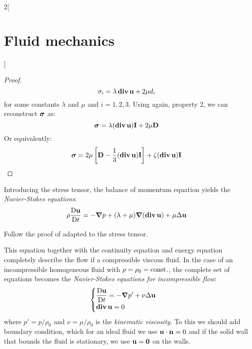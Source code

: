\documentclass[../../../main_physics.tex]{subfiles}
\begin{document}
\begin{multicols}{2}[\section{Fluid mechanics}]
\begin{proof}
    $$
      \sigma_i=\lambda \operatorname{\boldsymbol{\mathrm{div}}} \boldsymbol{\mathrm{u}} + 2\mu d_i
    $$
    for some constants $\lambda$ and $\mu$ and $i=1,2,3$. Using again, property 2, we can reconstruct $\boldsymbol{\mathrm{\sigma}}$ as:
    $$
      \boldsymbol{\mathrm{\sigma}}=\lambda (\operatorname{\boldsymbol{\mathrm{div}}} \boldsymbol{\mathrm{u}}) \boldsymbol{\mathrm{I}} + 2\mu \boldsymbol{\mathrm{D}}
    $$
    Or equivalently:
    $$
      \boldsymbol{\mathrm{\sigma}}=2\mu\left[\boldsymbol{\mathrm{D}} -\frac{1}{3}(\operatorname{\boldsymbol{\mathrm{div}}}\boldsymbol{\mathrm{u}}) \boldsymbol{\mathrm{I}}\right]+\zeta(\operatorname{\boldsymbol{\mathrm{div}}}\boldsymbol{\mathrm{u}}) \boldsymbol{\mathrm{I}}
    $$
  \end{proof}
  \begin{corollary}
    Introducing the stress tensor, the balance of momentum equation yields the \emph{Navier-Stokes equations}:
    $$
      \rho \frac{\mathrm{D}\boldsymbol{\mathrm{u}}}{\mathrm{D}t}=-\grad p + (\lambda+\mu)\grad(\operatorname{\boldsymbol{\mathrm{div}}}\boldsymbol{\mathrm{u}}) + \mu\Delta\boldsymbol{\mathrm{u}}
    $$
  \end{corollary}
  \begin{sproof}
    Follow the proof of  adapted to the stress tensor.
  \end{sproof}
  \begin{remark}
    This equation together with the continuity equation and energy equation completely describe the flow if a compressible viscous fluid. In the case of an incompressible homogeneous fluid with $\rho=\rho_0=\text{const.}$,  the
    complete set of equations becomes the \emph{Navier-Stokes equations for incompressible flow}:
    $$
      \begin{cases}
        \displaystyle\frac{\mathrm{D}\boldsymbol{\mathrm{u}}}{\mathrm{D}t}=-\grad p' + \nu\Delta\boldsymbol{\mathrm{u}} \\
        \displaystyle\operatorname{\boldsymbol{\mathrm{div}}}\boldsymbol{\mathrm{u}}=0
      \end{cases}
    $$
    where $p'=p/\rho_0$ and $\nu=\mu/\rho_0$ is the \emph{kinematic viscosity}. To this we should add boundary condition, which for an ideal fluid we use $\boldsymbol{\mathrm{u}}\cdot \boldsymbol{\mathrm{n}}=0$ and if the solid wall that bounds the fluid is stationary, we use $\boldsymbol{\mathrm{u}}=\boldsymbol{\mathrm{0}}$ on the walls.
  \end{remark}

\end{multicols}
\end{document}
